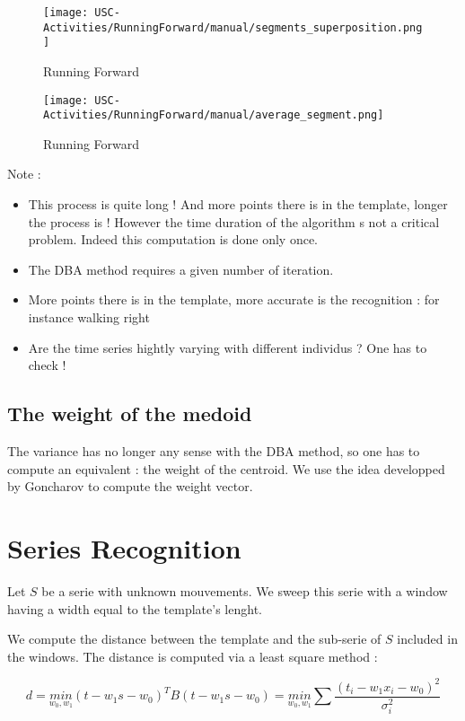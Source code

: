 \documentclass[a4,12pt]{article}
\begin{document}
	\begin{figure}[H]
		\centering
		\texttt{[image: USC-Activities/RunningForward/manual/segments\_superposition.png]}
		\caption{Running Forward}
		\label{RunningForwardAverage}
	\end{figure}
	
	\begin{figure}[H]
		\centering
		\texttt{[image: USC-Activities/RunningForward/manual/average\_segment.png]}
		\caption{Running Forward}
		\label{RunningForwardAverage}
	\end{figure}	
	
	Note :
	\begin{itemize}
		\item This process is quite long ! And more points there is in the template, longer the process is ! However the time duration of the algorithm s not a critical problem. Indeed this computation is done only once.
		\item The DBA method requires a given number of iteration.
		\item More points there is in the template, more accurate is the recognition : for instance walking right
		\item Are the time series hightly varying with different individus ? One has to check !
	\end{itemize}
	
	\subsection{The weight of the medoid}
	
	The variance has no longer any sense with the DBA method, so one has to compute an equivalent : the weight of the centroid. We use the idea developped by Goncharov\cite{goncharov} to compute the weight vector. 

	
	\section{Series Recognition}
	
	Let $S$ be a serie with unknown mouvements. We sweep this serie with a window having a width equal to the template's lenght.
	
	We compute the distance between the template and the sub-serie of $S$ included in the windows.
	The distance is computed via a least square method :
	
	\[ d = \underset{w_0,w_1}{min} (t - w_1 s - w_0)^T B (t - w_1 s - w_0) = \underset{w_0,w_1}{min} \sum \frac{(t_i - w_1 x_i - w_0)^2}{\sigma_i^2} \]
	
\end{document}
